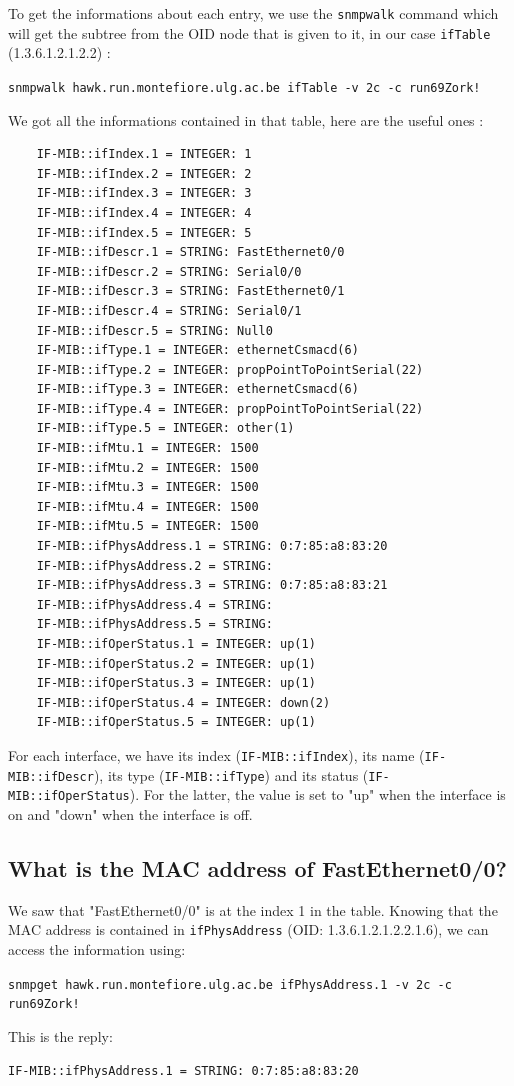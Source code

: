 \documentclass[a4paper,titlepage]{article}
\begin{document}
To get the informations about each entry, we use the \texttt{snmpwalk} command which will get the subtree from the OID node that is given to it, in our case \texttt{ifTable} (1.3.6.1.2.1.2.2) :
\begin{center}
	\texttt{snmpwalk hawk.run.montefiore.ulg.ac.be ifTable -v 2c -c run69Zork!}
\end{center}
We got all the informations contained in that table, here are the useful ones : 
\begin{verbatim}
	IF-MIB::ifIndex.1 = INTEGER: 1
	IF-MIB::ifIndex.2 = INTEGER: 2
	IF-MIB::ifIndex.3 = INTEGER: 3
	IF-MIB::ifIndex.4 = INTEGER: 4
	IF-MIB::ifIndex.5 = INTEGER: 5
	IF-MIB::ifDescr.1 = STRING: FastEthernet0/0
	IF-MIB::ifDescr.2 = STRING: Serial0/0
	IF-MIB::ifDescr.3 = STRING: FastEthernet0/1
	IF-MIB::ifDescr.4 = STRING: Serial0/1
	IF-MIB::ifDescr.5 = STRING: Null0
	IF-MIB::ifType.1 = INTEGER: ethernetCsmacd(6)
	IF-MIB::ifType.2 = INTEGER: propPointToPointSerial(22)
	IF-MIB::ifType.3 = INTEGER: ethernetCsmacd(6)
	IF-MIB::ifType.4 = INTEGER: propPointToPointSerial(22)
	IF-MIB::ifType.5 = INTEGER: other(1)
	IF-MIB::ifMtu.1 = INTEGER: 1500
	IF-MIB::ifMtu.2 = INTEGER: 1500
	IF-MIB::ifMtu.3 = INTEGER: 1500
	IF-MIB::ifMtu.4 = INTEGER: 1500
	IF-MIB::ifMtu.5 = INTEGER: 1500
	IF-MIB::ifPhysAddress.1 = STRING: 0:7:85:a8:83:20
	IF-MIB::ifPhysAddress.2 = STRING: 
	IF-MIB::ifPhysAddress.3 = STRING: 0:7:85:a8:83:21
	IF-MIB::ifPhysAddress.4 = STRING: 
	IF-MIB::ifPhysAddress.5 = STRING: 
	IF-MIB::ifOperStatus.1 = INTEGER: up(1)
	IF-MIB::ifOperStatus.2 = INTEGER: up(1)
	IF-MIB::ifOperStatus.3 = INTEGER: up(1)
	IF-MIB::ifOperStatus.4 = INTEGER: down(2)
	IF-MIB::ifOperStatus.5 = INTEGER: up(1)
\end{verbatim}
For each interface, we have its index (\texttt{IF-MIB::ifIndex}), its name (\texttt{IF-MIB::ifDescr}), its type (\texttt{IF-MIB::ifType}) and its status (\texttt{IF-MIB::ifOperStatus}). For the latter, the value is set to "up" when the interface is on and "down" when the interface is off.

	\subsection{What is the MAC address of FastEthernet0/0?}
We saw that "FastEthernet0/0" is at the index 1 in the table. Knowing that the MAC address is contained in \texttt{ifPhysAddress} (OID: 1.3.6.1.2.1.2.2.1.6), we can access the information using: 
\begin{center}
	\texttt{snmpget hawk.run.montefiore.ulg.ac.be ifPhysAddress.1 -v 2c -c run69Zork!}
\end{center}
This is the reply: 
\begin{center}
	\texttt{IF-MIB::ifPhysAddress.1 = STRING: 0:7:85:a8:83:20}
\end{center}
\end{document}
